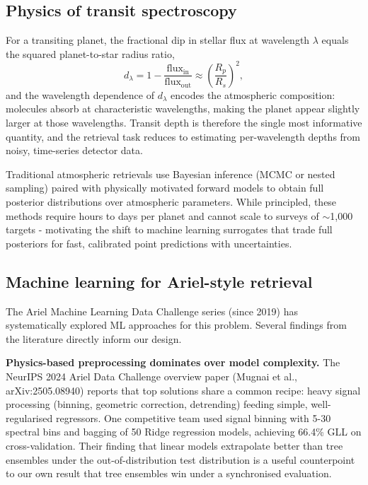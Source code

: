 \documentclass[12pt]{article}
\begin{document}
\subsection{Physics of transit spectroscopy}

For a transiting planet, the fractional dip in stellar flux at wavelength $\lambda$ equals the squared planet-to-star radius ratio,
\[
d_\lambda = 1 - \frac{\text{flux}_{\text{in}}}{\text{flux}_{\text{out}}} \approx \left(\frac{R_p}{R_s}\right)^2,
\]
and the wavelength dependence of $d_\lambda$ encodes the atmospheric composition: molecules absorb at characteristic wavelengths, making the planet appear slightly larger at those wavelengths. Transit depth is therefore the single most informative quantity, and the retrieval task reduces to estimating per-wavelength depths from noisy, time-series detector data.

Traditional atmospheric retrievals use Bayesian inference (MCMC or nested sampling) paired with physically motivated forward models to obtain full posterior distributions over atmospheric parameters. While principled, these methods require hours to days per planet and cannot scale to surveys of $\sim$1,000 targets - motivating the shift to machine learning surrogates that trade full posteriors for fast, calibrated point predictions with uncertainties.

\subsection{Machine learning for Ariel-style retrieval}

The Ariel Machine Learning Data Challenge series (since 2019) has systematically explored ML approaches for this problem. Several findings from the literature directly inform our design.

\textbf{Physics-based preprocessing dominates over model complexity.} The NeurIPS 2024 Ariel Data Challenge overview paper (Mugnai et al., arXiv:2505.08940) reports that top solutions share a common recipe: heavy signal processing (binning, geometric correction, detrending) feeding simple, well-regularised regressors. One competitive team used signal binning with 5-30 spectral bins and bagging of 50 Ridge regression models, achieving 66.4\% GLL on cross-validation. Their finding that linear models extrapolate better than tree ensembles under the out-of-distribution test distribution is a useful counterpoint to our own result that tree ensembles win under a synchronised evaluation.
\end{document}
